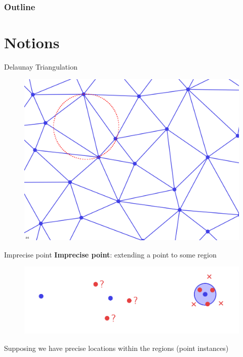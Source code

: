 \documentclass{beamer}
\begin{document}
\begin{frame}
\frametitle{Outline}
\tableofcontents
\end{frame}

\section{Notions}
\frame{\tableofcontents[currentsection]}

\begin{frame}{Delaunay Triangulation}
\begin{figure}
		\centering
	\includegraphics[scale=0.3]{img/delaunayTriangulation.png}
	\end{figure}
\end{frame}

\begin{frame}{Imprecise point}
\textbf{Imprecise point}: extending a point to some region
\begin{figure}
		\centering
	\includegraphics[width=\textwidth]{img/imprecise_point.png}
	\end{figure}
\pause
Supposing we have precise locations within the regions (point instances)
\end{frame}
\end{document}
